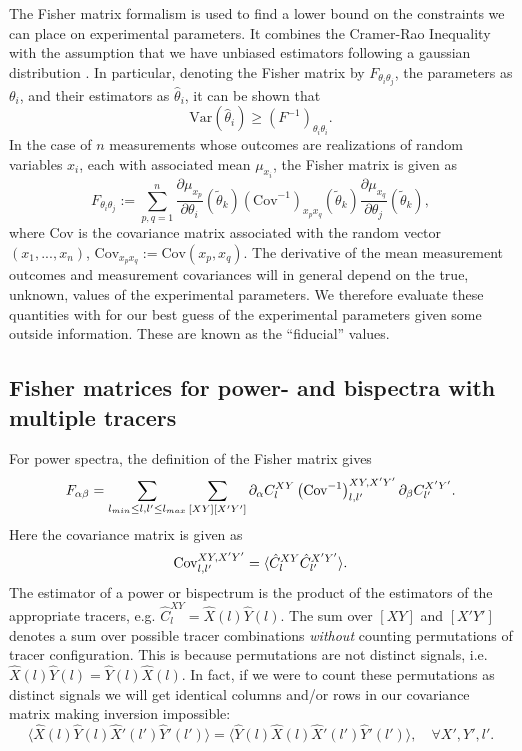 \documentclass[11pt]{article} %
\DeclareRobustCommand{\Cov}{\ifmmode\text{Cov}\else d\fi}
\newcommand{\br}[1]{\ensuremath{\left( #1 \right)}}
\begin{document}
The Fisher matrix formalism is used to find a lower bound on the constraints we can place on experimental parameters. It combines the Cramer-Rao Inequality \cite{casella2002statistical} with the assumption that we have unbiased estimators  following a gaussian distribution \cite{dodelson2020modern}. In particular, denoting the Fisher matrix by $F_{\theta_i\theta_j}$, the parameters as $\theta_i$, and their estimators as $\hat\theta_i$, it can be shown that
\begin{equation}
    \text{Var}(\hat\theta_i) \geq \br{F^{-1}}_{\theta_i\theta_i}.
\end{equation}
In the case of $n$ measurements whose outcomes are realizations of random variables $x_i$, each with associated mean $\mu_{x_i}$, the Fisher matrix is given as
\begin{equation}
    F_{\theta_i\theta_j} := \sum_{p, q=1}^n \frac{\partial\mu_{x_p}}{\partial\theta_i}(\tilde\theta_k)(\text{Cov}^{-1})_{x_px_q}(\tilde \theta_k)\frac{\partial\mu_{x_q}}{\partial\theta_j}(\tilde\theta_k),
\end{equation}
where Cov is the covariance matrix associated with the random vector $(x_1, ..., x_n)$, $\text{Cov}_{x_px_q}:=\text{Cov}(x_p,x_q)$. The derivative of the mean measurement outcomes and measurement covariances will in general depend on the true, unknown, values of the experimental parameters. We therefore evaluate these quantities with for our best guess of the experimental parameters given some outside information. These are known as the ``fiducial'' values.



\subsection{Fisher matrices for power- and bispectra with multiple tracers}
For power spectra, the definition of the Fisher matrix gives 
\begin{equation*}
    F_{\alpha\beta} = \sum_{l_{min}\leq l, l' \leq l_{max}}\sum_{[XY][X'Y']} \partial_\alpha C_{l}^{XY} \br{\Cov^{-1}}^{XY, X'Y'}_{l, l'} \partial_\beta C^{X'Y'}_{l'}.
\end{equation*}
Here the covariance matrix is given as
\begin{equation*}
    \Cov^{XY, X'Y'}_{l, l'} = \langle \hat C^{XY}_{l} \hat C^{X'Y'}_{l'} \rangle.
\end{equation*}
The estimator of a power or bispectrum is the product of the estimators of the appropriate tracers, e.g. $\hat C^{XY}_{l} = \hat X(l) \hat Y(l)$. The sum over $[XY]$ and $[X'Y']$ denotes a sum over possible tracer combinations \textit{without} counting permutations of tracer configuration. This is because permutations are not distinct signals, i.e. $\hat X(l) \hat Y(l) = \hat Y(l) \hat X(l)$. In fact, if we were to count these permutations as distinct signals we will get identical columns and/or rows in our covariance matrix making inversion impossible:
\begin{equation*}
    \langle \hat X(l) \hat Y (l) \hat X'(l') \hat Y' (l') \rangle = \langle \hat Y (l) \hat X (l) \hat X'(l') \hat Y' (l') \rangle, \quad \forall X', Y', l'. 
\end{equation*}
\end{document}
